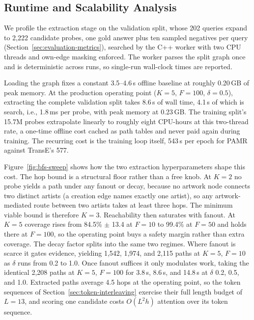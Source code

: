 \documentclass[runningheads]{llncs}
\begin{document}
\subsection{Runtime and Scalability Analysis}
\label{sec:runtime}

We profile the extraction stage on the validation split, whose 202
queries expand to 2,222 candidate probes, one gold answer plus ten
sampled negatives per query (Section~\ref{sec:evaluation-metrics}),
searched by the C++ worker with two CPU threads and own-edge masking
enforced. The worker parses the split graph once and is deterministic
across runs, so single-run wall-clock times are reported.

Loading the graph fixes a constant 3.5--4.6\,s offline baseline at
roughly 0.20\,GB of peak memory. At the production
operating point ($K = 5$, $F = 100$, $\delta = 0.5$), extracting the
complete validation split takes 8.6\,s of wall time, 4.1\,s of which is
search, i.e., 1.8\,ms per probe, with peak memory at 0.23\,GB. The
training split's 15.7M probes extrapolate linearly to roughly eight
CPU-hours at this two-thread rate, a one-time offline cost cached as
path tables and never paid again during training. The recurring cost is
the training loop itself, 543\,s per epoch for PAMR against TransE's
577.

Figure~\ref{fig:bfs-sweep} shows how the two extraction hyperparameters
shape this cost. The hop bound is a structural floor rather than a
free knob. At $K = 2$ no probe yields a path under any fanout or decay, because no
artwork node connects two distinct artists (a creation edge names
exactly one artist), so any artwork-mediated route between two artists
takes at least three hops. The minimum viable bound
is therefore $K = 3$. Reachability then saturates with fanout. At
$K = 5$ coverage rises from 84.5\% $\pm$ 13.4 at $F = 10$ to 99.4\% at
$F = 50$ and holds there at $F = 100$, so the operating point buys a
safety margin rather than extra coverage. The decay factor splits into
the same two regimes. Where fanout is scarce it gates evidence,
yielding 1{,}542, 1{,}974, and 2{,}115 paths at $K = 5$, $F = 10$ as
$\delta$ runs from 0.2 to 1.0. Once fanout suffices it only modulates
work, taking the identical 2{,}208 paths at $K = 5$, $F = 100$ for
3.8\,s, 8.6\,s, and 14.8\,s at $\delta$ 0.2, 0.5, and 1.0. Extracted
paths average 4.5 hops at the operating point, so the token sequences
of Section~\ref{sec:token-interleaving} exercise their full length
budget of $L = 13$, and scoring one candidate costs $O(L^{2}h)$
attention over its token sequence.
\end{document}
